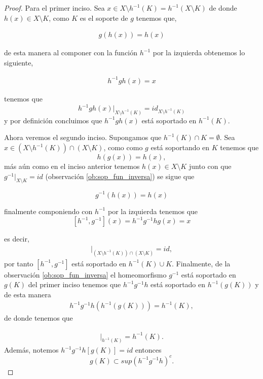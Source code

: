 \begin{proof}
Para el primer inciso. Sea $x \in X \setminus h^{-1}(K)= h^{-1}( X \setminus K)$ de donde $h(x) \in X \setminus K$, como $K$  es el soporte de $g$ tenemos que,

\begin{align*}
g(h(x))=h(x)
\end{align*}

de esta manera al componer con la función $h^{-1}$ por la izquierda obtenemos lo siguiente,

	\begin{align*}
	h^{-1}gh(x)=x
	\end{align*}

tenemos que
 $$h^{-1}gh(x)|_{X \setminus h^{-1}(K)}=id_{X \setminus h^{-1}(K)}$$ 
 y por definición concluimos que $h^{-1}gh(x)$ está soportado en $h^{-1}(K).$

Ahora veremos el segundo inciso. Supongamos que $h^{-1}(K) \cap K = \emptyset$. Sea $x \in (X \setminus h^{-1}(K)) \cap (X \setminus K)$, como como $g$ está soportando en $K$ tenemos que $$h(g(x))=h(x),$$  más aún como en el inciso anterior tenemos $h(x)\in X \setminus K$ junto con que $g^{-1}|_{X \setminus K}=id$ (observación \ref{ob:sop_fun_inversa}) se sigue que
 
  $$g^{-1}(h(x))=h(x)$$ 
  
 finalmente componiendo con $h^{-1}$ por la izquierda tenemos que  $$ [h^{-1},g^{-1}](x)=h^{-1}g^{-1}hg(x)=x$$
 
 es decir, 
\begin{align*}
 [h^{-1},g^{-1}]|_{(X \setminus h^{-1}(K)) \cap (X \setminus K) }=id,
\end{align*}
 por tanto $[h^{-1},g^{-1}]$ está soportado en $h^{-1}(K) \cup K.$ Finalmente, de la observación \ref{ob:sop_fun_inversa} el homeomorfismo $g^{-1}$ está soportado en $g(K)$ del primer inciso tenemos que $h^{-1}g^{-1}h$ está soportado en $h^{-1}(g(K))$ y de esta manera
	\begin{align*}
	h^{-1}g^{-1}h(h^{-1}(g(K)))=h^{-1}(K),
	\end{align*}	  
  de donde tenemos que
   
\begin{align*}
  [h^{-1},g^{-1}]|_{h^{-1}(K)}=h^{-1}(K).
\end{align*}  
	 Además, notemos $h^{-1}g^{-1}h[g(K)]=id$ entonces  $$g(K) \subset sup(h^{-1}g^{-1}h)^c.$$
\end{proof}




